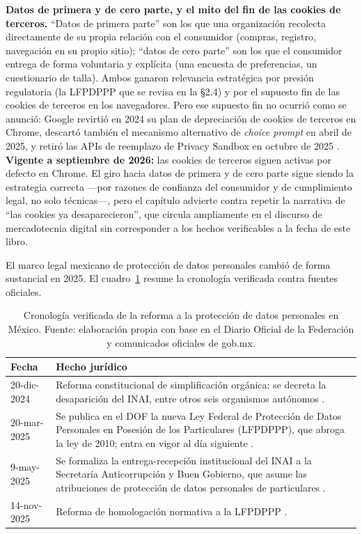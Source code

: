 \begin{cajaFrontera}
\textbf{Datos de primera y de cero parte, y el mito del fin de las cookies de
terceros.} \enquote{Datos de primera parte} son los que una organización
recolecta directamente de su propia relación con el consumidor (compras,
registro, navegación en su propio sitio); \enquote{datos de cero parte} son los
que el consumidor entrega de forma voluntaria y explícita (una encuesta de
preferencias, un cuestionario de talla). Ambos ganaron relevancia
estratégica por presión regulatoria (la LFPDPPP que se revisa en la §2.4) y
por el supuesto fin de las cookies de terceros en los navegadores. Pero ese
supuesto fin no ocurrió como se anunció: Google revirtió en 2024 su plan de
depreciación de cookies de terceros en Chrome, descartó también el mecanismo
alternativo de \textit{choice prompt} en abril de 2025, y retiró las APIs de
reemplazo de Privacy Sandbox en octubre de 2025
\parencite{eprs2025darkpatterns}. \textbf{Vigente a septiembre de 2026:} las
cookies de terceros siguen activas por defecto en Chrome. El giro hacia
datos de primera y de cero parte sigue siendo la estrategia correcta —por
razones de confianza del consumidor y de cumplimiento legal, no solo
técnicas—, pero el capítulo advierte contra repetir la narrativa de
\enquote{las cookies ya desaparecieron}, que circula ampliamente en el
discurso de mercadotecnia digital sin corresponder a los hechos verificables
a la fecha de este libro.
\end{cajaFrontera}

El marco legal mexicano de protección de datos personales cambió de forma
sustancial en 2025. El cuadro~\ref{tab:cap03-lfpdppp} resume la cronología
verificada contra fuentes oficiales.

\begin{table}[htbp]
\centering
\begin{tabular}{@{}p{2.6cm}p{9.6cm}@{}}
\toprule
Fecha & Hecho jurídico \\
\midrule
20-dic-2024 & Reforma constitucional de simplificación orgánica: se decreta la desaparición del INAI, entre otros seis organismos autónomos \parencite{dof_simplificacion2024}. \\
20-mar-2025 & Se publica en el DOF la nueva Ley Federal de Protección de Datos Personales en Posesión de los Particulares (LFPDPPP), que abroga la ley de 2010; entra en vigor al día siguiente \parencite{dof_lfpdppp2025}. \\
9-may-2025 & Se formaliza la entrega-recepción institucional del INAI a la Secretaría Anticorrupción y Buen Gobierno, que asume las atribuciones de protección de datos personales de particulares \parencite{sabg2025entregarecepcion}. \\
14-nov-2025 & Reforma de homologación normativa a la LFPDPPP \parencite{dof_lfpdppp_reforma2025nov}. \\
\bottomrule
\end{tabular}
\caption{Cronología verificada de la reforma a la protección de datos
personales en México. Fuente: elaboración propia con base en el Diario
Oficial de la Federación y comunicados oficiales de gob.mx.}
\label{tab:cap03-lfpdppp}
\end{table}


